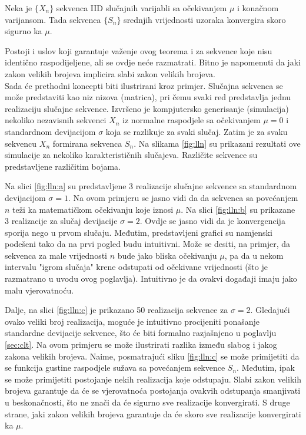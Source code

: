 \begin{theorem}
  Neka je $\{X_n\}$ sekvenca IID slučajnih varijabli sa očekivanjem $\mu$ i
  konačnom varijansom. Tada sekvenca $\{S_n\}$ srednjih vrijednosti uzoraka
  konvergira skoro sigurno ka $\mu$.
\end{theorem}

Postoji i uslov koji garantuje važenje ovog teorema i za sekvence koje nisu
identično raspodijeljene, ali se ovdje neće razmatrati. Bitno je napomenuti da
jaki zakon velikih brojeva implicira slabi zakon velikih brojeva. \\

Sada će prethodni koncepti biti ilustrirani kroz primjer. Slučajna sekvenca se
može predstaviti kao niz nizova (matrica), pri čemu svaki red predstavlja jednu
realizaciju slučajne sekvence. Izvršeno je kompjutersko generisanje (simulacija)
nekoliko nezavisnih sekvenci $X_n$ iz normalne raspodjele sa očekivanjem $\mu=0$
i standardnom devijacijom $\sigma$ koja se razlikuje za svaki slučaj.  Zatim je
za svaku sekvencu $X_n$ formirana sekvenca $S_n$. Na slikama \ref{fig:lln} su
prikazani rezultati ove simulacije za nekoliko karakterističnih slučajeva.
Različite sekvence su predstavljene različitim bojama.

Na slici \ref{fig:lln:a} su predstavljene 3 realizacije slučajne sekvence sa
standardnom devijacijom $\sigma=1$. Na ovom primjeru se jasno vidi da da
sekvenca sa povećanjem $n$ teži ka matematičkom očekivanju koje iznosi $\mu$. Na
slici \ref{fig:lln:b} su prikazane 3 realizacije za slučaj devijacije
$\sigma=2$. Ovdje se jasno vidi da je konvergencija sporija nego u prvom
slučaju. Međutim, predstavljeni grafici su namjenski podešeni tako da na prvi
pogled budu intuitivni. Može se desiti, na primjer, da sekvenca za male
vrijednosti $n$ bude jako bliska očekivanju $\mu$, pa da u nekom intervalu
"igrom slučaja" krene odstupati od očekivane vrijednosti (što je razmatrano u
uvodu ovog poglavlja). Intuitivno je da ovakvi događaji imaju jako malu
vjerovatnoću.

Dalje, na slici \ref{fig:lln:c} je prikazano 50 realizacija sekvence za
$\sigma=2$. Gledajući ovako veliki broj realizacija, moguće je intuitivno
procijeniti ponašanje standardne devijacije sekvence, što će biti formalno
razjašnjeno u poglavlju \ref{sec:clt}. Na ovom primjeru se može ilustrirati
razlika između slabog i jakog zakona velikih brojeva. Naime, posmatrajući sliku
\ref{fig:lln:c} se može primijetiti da se funkcija gustine raspodjele sužava sa
povećanjem sekvence $S_n$. Međutim, ipak se može primijetiti postojanje nekih
realizacija koje odstupaju. Slabi zakon velikih brojeva garantuje da će se
vjerovatnoća postojanja ovakvih odstupanja smanjivati u beskonačnosti, što ne
znači da će sigurno sve realizacije konvergirati.  S druge strane, jaki zakon
velikih brojeva garantuje da će skoro sve realizacije konvergirati ka $\mu$.

